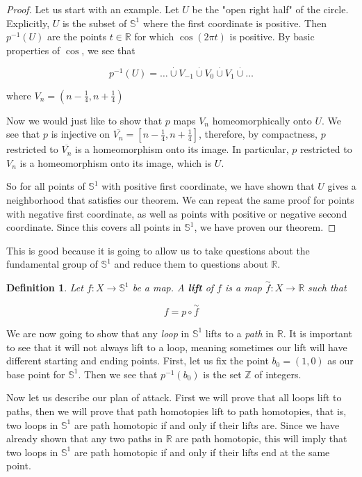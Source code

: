 \documentclass[a4paper]{article}
\newtheorem{definition}[theorem]{Definition}
\numberwithin{theorem}{section}
\begin{document}
\begin{proof}
Let us start with an example. Let $U$ be the "open right half" of the circle. Explicitly, $U$ is the subset of $\mathbb{S}^1$ where the first coordinate is positive. Then $p^{-1}(U)$ are the points $t \in \mathbb{R}$ for which $\cos(2\pi t)$ is positive. By basic properties of $\cos$, we see that

$$ p^{-1}(U) = \dots \overset{\cdot}{\cup} V_{-1} \overset{\cdot}{\cup} V_0 \overset{\cdot}{\cup} V_1 \overset{\cdot}{\cup} \dots $$

where $V_n = (n- \frac{1}{4}, n + \frac{1}{4})$

Now we would just like to show that $p$ maps $V_n$ homeomorphically onto $U$. We see that $p$ is injective on $\overline{V_n} = [n- \frac{1}{4}, n + \frac{1}{4}]$, therefore, by compactness, $p$ restricted to $\overline{V_n}$ is a homeomorphism onto its image. In particular, $p$ restricted to $V_n$ is a homeomorphism onto its image, which is $U$.

So for all points of $\mathbb{S}^1$ with positive first coordinate, we have shown that $U$ gives a neighborhood that satisfies our theorem. We can repeat the same proof for points with negative first coordinate, as well as points with positive or negative second coordinate. Since this covers all points in $\mathbb{S}^1$, we have proven our theorem.
\end{proof}

This is good because it is going to allow us to take questions about the fundamental group of $\mathbb{S}^1$ and reduce them to questions about $\mathbb{R}$.

\begin{definition}
Let $f: X \rightarrow \mathbb{S}^1$ be a map. A \textbf{lift} of $f$ is a map $\overset{\sim}{f}: X \rightarrow \mathbb{R}$ such that 

$$ f = p \circ \overset{\sim}{f} $$
\end{definition}

We are now going to show that any \textit{loop} in $\mathbb{S}^1$ lifts to a \textit{path} in $\mathbb{R}$. It is important to see that it will not always lift to a loop, meaning sometimes our lift will have different starting and ending points. First, let us fix the point $b_0 = (1,0)$ as our base point for $\mathbb{S}^1$. Then we see that $p^{-1}(b_0)$ is the set $\mathbb{Z}$ of integers.

Now let us describe our plan of attack. First we will prove that all loops lift to paths, then we will prove that path homotopies lift to path homotopies, that is, two loops in $\mathbb{S}^1$ are path homotopic if and only if their lifts are. Since we have already shown that any two paths in $\mathbb{R}$ are path homotopic, this will imply that two loops in $\mathbb{S}^1$ are path homotopic if and only if their lifts end at the same point.
\end{document}
